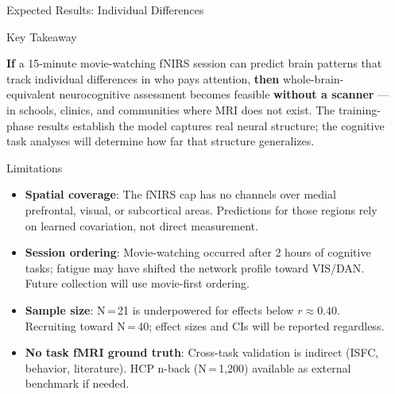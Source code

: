 \documentclass[final]{beamer}
\newlength{\sepwidth}
\newlength{\colwidth}
\newcommand{\separatorcolumn}{\begin{column}{\sepwidth}\end{column}}
\begin{document}
\begin{frame}[t]
\begin{columns}[t]
\begin{column}{\colwidth}
\begin{block}{Expected Results: Individual Differences}
  \end{block}

  \begin{exampleblock}{Key Takeaway}

    \textbf{If} a 15-minute movie-watching fNIRS session can predict brain patterns that track individual differences in who pays attention, \textbf{then} whole-brain-equivalent neurocognitive assessment becomes feasible \textbf{without a scanner} --- in schools, clinics, and communities where MRI does not exist. The training-phase results establish the model captures real neural structure; the cognitive task analyses will determine how far that structure generalizes.

  \end{exampleblock}

  \begin{block}{Limitations}

    \begin{itemize}
      \item \textbf{Spatial coverage}: The fNIRS cap has no channels over medial prefrontal, visual, or subcortical areas. Predictions for those regions rely on learned covariation, not direct measurement.
      \item \textbf{Session ordering}: Movie-watching occurred after 2 hours of cognitive tasks; fatigue may have shifted the network profile toward VIS/DAN. Future collection will use movie-first ordering.
      \item \textbf{Sample size}: N\,=\,21 is underpowered for effects below $r \approx 0.40$. Recruiting toward N\,=\,40; effect sizes and CIs will be reported regardless.
      \item \textbf{No task fMRI ground truth}: Cross-task validation is indirect (ISFC, behavior, literature). HCP n-back (N\,=\,1{,}200) available as external benchmark if needed.
    \end{itemize}

  \end{block}

\end{column}

\separatorcolumn
\end{columns}
\end{frame}
\end{document}
